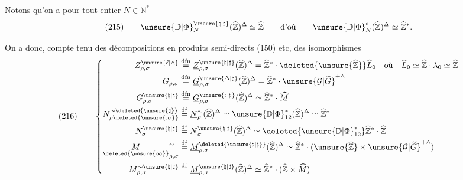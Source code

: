 Notons qu'on a pour tout entier $N\in\mathbb N^{*}$
\[
(215)\qquad
\unsure{\mathbb D|\Phi}_{N}^{\unsure{\natural|\sharp}}
(\widehat{\mathbb Z})^{\Delta}\simeq\widehat{\mathbb Z}
\qquad\text{d'où}\qquad
\unsure{\mathbb D|\Phi}_{N}^{*}(\widehat{\mathbb Z})^{\Delta}
\simeq\widehat{\mathbb Z}^{*}.
\]

On a donc, compte tenu des décompositions en produits semi-directs (150) etc,
des isomorphismes
\[
(216)\qquad
\left\{\begin{aligned}
Z_{\rho,\sigma}^{\unsure{\ell|\wedge}}
&\overset{\mathrm{dfn}}{=}
\underline Z_{\rho,\sigma}^{\unsure{\natural|\sharp}}
(\widehat{\mathbb Z})^{\Delta}
=\widehat{\mathbb Z}^{*}\cdot
\deleted{\unsure{\widehat{\mathbb Z}}}\widehat L_0
\quad\text{où}\quad
\widehat L_0\simeq\widehat{\mathbb Z}\cdot\lambda_0\simeq\widehat{\mathbb Z}
\\
G_{\rho,\sigma}
&\overset{\mathrm{dfn}}{=}
\underline G_{\rho,\sigma}^{\unsure{\Delta|\natural}}
(\widehat{\mathbb Z})^{\Delta}
=\widehat{\mathbb Z}^{*}\cdot
\underline{\unsure{\mathcal G|\widetilde G}}^{+\wedge}
\\
G_{\rho,\sigma}^{\unsure{\natural|\sharp}}
&\overset{\mathrm{dfn}}{=}
\underline G_{\rho,\sigma}^{\unsure{\natural|\sharp}}
(\widehat{\mathbb Z})^{\Delta}
\simeq\widehat{\mathbb Z}^{*}\cdot\widehat M
\\
N_{\rho\deleted{\unsure{,\sigma}}}^{\sim\deleted{\unsure{\natural}}}
&\overset{\mathrm{df}}{=}
\underline N_\rho^{\sim}(\widehat{\mathbb Z})^{\Delta}
\simeq\unsure{\mathbb D|\Phi}_{12}^{*}
(\widehat{\mathbb Z})^{\Delta}\simeq\widehat{\mathbb Z}^{*}
\\
N_\sigma^{\unsure{\natural|\sharp}}
&\overset{\mathrm{df}}{=}
\underline N_\sigma^{\unsure{\natural|\sharp}}
(\widehat{\mathbb Z})^{\Delta}
\simeq\deleted{\unsure{\mathbb D|\Phi}_{12}^{*}}
\widehat{\mathbb Z}^{*}\cdot\widehat{\mathbb Z}
\\
\underset{\deleted{\unsure{\infty}}}{M}_{\rho,\sigma}^{\sim}
&\overset{\mathrm{df}}{=}
\underline M_{\rho,\sigma}^{\deleted{\unsure{\natural|\sharp}}}
(\widehat{\mathbb Z})^{\Delta}
\simeq\widehat{\mathbb Z}^{*}\cdot
(\unsure{\widehat{\mathbb Z}}\times
\unsure{\mathcal G|\widetilde G}^{+\wedge})
\\
M_{\rho,\sigma}^{\sim\unsure{\natural|\sharp}}
&\overset{\mathrm{df}}{=}
\underline M_{\rho,\sigma}^{\unsure{\natural|\sharp}}
(\widehat{\mathbb Z})^{\Delta}
\simeq\widehat{\mathbb Z}^{*}\cdot
(\widehat{\mathbb Z}\times\widehat M)
\end{aligned}\right.
\]
